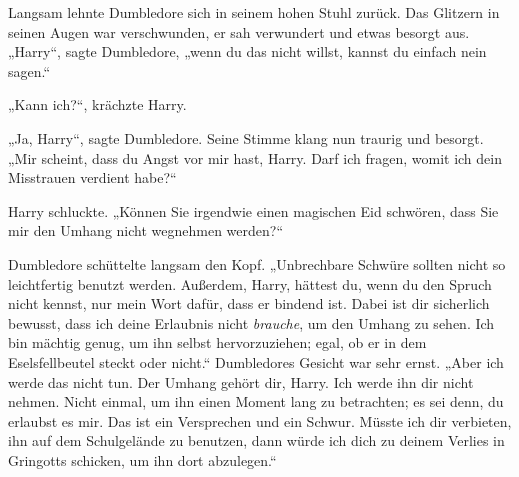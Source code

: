 Langsam lehnte Dumbledore sich in seinem hohen Stuhl zurück. Das Glitzern in seinen Augen war verschwunden, er sah verwundert und etwas besorgt aus. „Harry“, sagte Dumbledore, „wenn du das nicht willst, kannst du einfach nein sagen.“

„Kann ich?“, krächzte Harry.

„Ja, Harry“, sagte Dumbledore. Seine Stimme klang nun traurig und besorgt. „Mir scheint, dass du Angst vor mir hast, Harry. Darf ich fragen, womit ich dein Misstrauen verdient habe?“

Harry schluckte. „Können Sie irgendwie einen magischen Eid schwören, dass Sie mir den Umhang nicht wegnehmen werden?“

Dumbledore schüttelte langsam den Kopf. „Unbrechbare Schwüre sollten nicht so leichtfertig benutzt werden. Außerdem, Harry, hättest du, wenn du den Spruch nicht kennst, nur mein Wort dafür, dass er bindend ist. Dabei ist dir sicherlich bewusst, dass ich deine Erlaubnis nicht \emph{brauche}, um den Umhang zu sehen. Ich bin mächtig genug, um ihn selbst hervorzuziehen; egal, ob er in dem Eselsfellbeutel steckt oder nicht.“ Dumbledores Gesicht war sehr ernst. „Aber ich werde das nicht tun. Der Umhang gehört dir, Harry. Ich werde ihn dir nicht nehmen. Nicht einmal, um ihn einen Moment lang zu betrachten; es sei denn, du erlaubst es mir. Das ist ein Versprechen und ein Schwur. Müsste ich dir verbieten, ihn auf dem Schulgelände zu benutzen, dann würde ich dich zu deinem Verlies in Gringotts schicken, um ihn dort abzulegen.“


